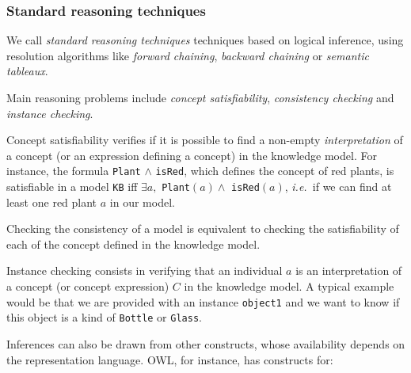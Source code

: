 \documentclass[a4paper, twocolumn]{article}
\newcommand{\ie}{{\textit{i.e.\ }}}
\newcommand{\concept}[1]{{\footnotesize \texttt{#1}}}
\begin{document}
\subsubsection{Standard reasoning techniques}
\label{sect|std-reasoning}

We call \emph{standard reasoning techniques} techniques based on logical
inference, using resolution algorithms like \emph{forward chaining},
\emph{backward chaining} or \emph{semantic tableaux}.

Main reasoning problems include \emph{concept satisfiability},
\emph{consistency checking} and \emph{instance checking}.

Concept satisfiability verifies if it is possible to find a non-empty
\emph{interpretation} of a concept (or an expression defining a concept) in the
knowledge model. For instance, the formula \concept{Plant} $\land$
\concept{isRed}, which defines the concept of red plants, is satisfiable in a
model \concept{KB} iff $\exists a, $ \concept{Plant}$(a) \land$
\concept{isRed}$(a)$, \ie if we can find at least one red plant $a$ in our
model.

Checking the consistency of a model is equivalent to checking the
satisfiability of each of the concept defined in the knowledge model.

Instance checking consists in verifying that an individual $a$ is an
interpretation of a concept (or concept expression) $C$ in the knowledge model.
A typical example would be that we are provided with an instance
\concept{object1} and we want to know if this object is a kind of
\concept{Bottle} or \concept{Glass}.

Inferences can also be drawn from other constructs, whose availability depends
on the representation language. OWL, for instance, has constructs for:
\end{document}

